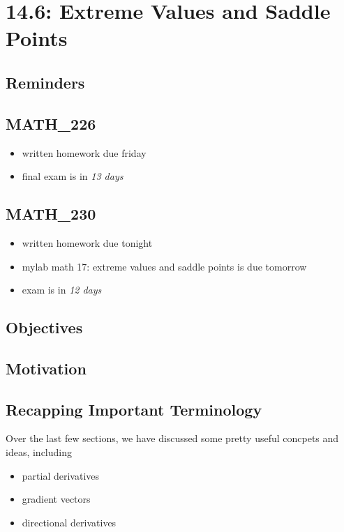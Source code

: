 \documentclass{report}
\begin{document}
\begin{sloppypar}
{}

\chapter{14.6: Extreme Values and Saddle Points}
\section{Reminders}
\section{MATH\_226}
\begin{itemize}
  \item written homework due friday
        \item final exam is in \textit{13 days}

\end{itemize}

\section{MATH\_230}
\begin{itemize}
  \item written homework due tonight
  \item mylab math 17: extreme values and saddle points is due tomorrow
  \item exam is in \textit{12 days}
\end{itemize}

\section{Objectives}
\section{Motivation}
\section{Recapping Important Terminology}
Over the last few sections, we have discussed
some pretty useful concpets and ideas, including
\begin{itemize}
  \item partial derivatives
  \item gradient vectors
  \item directional derivatives
\end{itemize}


\end{sloppypar}
\end{document}
